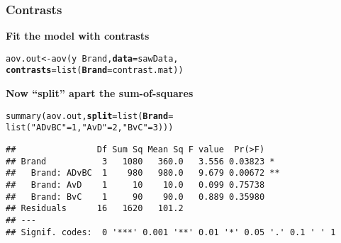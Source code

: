 \documentclass[color=usenames,dvipsnames]{beamer}\usepackage[]{graphicx}\usepackage[]{color}
\makeatletter
\newcommand{\hlnum}[1]{\textcolor[rgb]{0.69,0.494,0}{#1}}%
\newcommand{\hlstr}[1]{\textcolor[rgb]{0.749,0.012,0.012}{#1}}%
\newcommand{\hlopt}[1]{\textcolor[rgb]{0,0,0}{#1}}%
\newcommand{\hlstd}[1]{\textcolor[rgb]{0,0,0}{#1}}%
\newcommand{\hlkwb}[1]{\textcolor[rgb]{0,0.341,0.682}{#1}}%
\newcommand{\hlkwc}[1]{\textcolor[rgb]{0,0,0}{\textbf{#1}}}%
\newcommand{\hlkwd}[1]{\textcolor[rgb]{0.004,0.004,0.506}{#1}}%
\newenvironment{kframe}{%
 \def\at@end@of@kframe{}%
 \ifinner\ifhmode%
  \def\at@end@of@kframe{\end{minipage}}%
  \begin{minipage}{\columnwidth}%
 \fi\fi%
 \def\FrameCommand##1{\hskip\@totalleftmargin \hskip-\fboxsep
 \colorbox{shadecolor}{##1}\hskip-\fboxsep
     \hskip-\linewidth \hskip-\@totalleftmargin \hskip\columnwidth}%
 \MakeFramed {\advance\hsize-\width
   \@totalleftmargin\z@ \linewidth\hsize
   \@setminipage}}%
 {\par\unskip\endMakeFramed%
 \at@end@of@kframe}
\newenvironment{knitrout}{}{} %
\makeatother
\begin{document}





\begin{frame}[fragile]
  \frametitle{Contrasts}
{\bf Fit the model with contrasts}
\begin{footnotesize}
\begin{knitrout}
\color{fgcolor}\begin{kframe}
\begin{alltt}
\hlstd{aov.out} \hlkwb{<-} \hlkwd{aov}\hlstd{(y} \hlopt{~} \hlstd{Brand,} \hlkwc{data}\hlstd{=sawData,}
                \hlkwc{contrasts}\hlstd{=}\hlkwd{list}\hlstd{(}\hlkwc{Brand}\hlstd{=contrast.mat))}
\end{alltt}
\end{kframe}
\end{knitrout}
\pause
\vfill
{\bf Now ``split'' apart the sum-of-squares}
\begin{knitrout}
\color{fgcolor}\begin{kframe}
\begin{alltt}
\hlkwd{summary}\hlstd{(aov.out,} \hlkwc{split} \hlstd{=} \hlkwd{list}\hlstd{(}\hlkwc{Brand} \hlstd{=}
                      \hlkwd{list}\hlstd{(}\hlstr{"ADvBC"}\hlstd{=}\hlnum{1}\hlstd{,} \hlstr{"AvD"}\hlstd{=}\hlnum{2}\hlstd{,} \hlstr{"BvC"}\hlstd{=}\hlnum{3}\hlstd{)))}
\end{alltt}
\begin{verbatim}
##                Df Sum Sq Mean Sq F value  Pr(>F)   
## Brand           3   1080   360.0   3.556 0.03823 * 
##   Brand: ADvBC  1    980   980.0   9.679 0.00672 **
##   Brand: AvD    1     10    10.0   0.099 0.75738   
##   Brand: BvC    1     90    90.0   0.889 0.35980   
## Residuals      16   1620   101.2                   
## ---
## Signif. codes:  0 '***' 0.001 '**' 0.01 '*' 0.05 '.' 0.1 ' ' 1
\end{verbatim}
\end{kframe}
\end{knitrout}
\end{footnotesize}
\end{frame}
\end{document}

